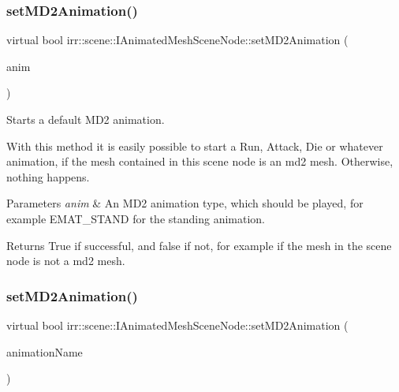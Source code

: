 \subsubsection{\texorpdfstring{set\+M\+D2\+Animation()}{setMD2Animation()}\hspace{0.1cm}{\footnotesize\ttfamily [2/4]}}
{\footnotesize\ttfamily virtual bool irr\+::scene\+::\+I\+Animated\+Mesh\+Scene\+Node\+::set\+M\+D2\+Animation (\begin{DoxyParamCaption}\item[{\hyperlink{namespaceirr_1_1scene_a08d4a84966e1d2886d0d57e4acbb4f19}{E\+M\+D2\+\_\+\+A\+N\+I\+M\+A\+T\+I\+O\+N\+\_\+\+T\+Y\+PE}}]{anim }\end{DoxyParamCaption})\hspace{0.3cm}{\ttfamily [pure virtual]}}



Starts a default M\+D2 animation. 

With this method it is easily possible to start a Run, Attack, Die or whatever animation, if the mesh contained in this scene node is an md2 mesh. Otherwise, nothing happens. 
\begin{DoxyParams}{Parameters}
{\em anim} & An M\+D2 animation type, which should be played, for example E\+M\+A\+T\+\_\+\+S\+T\+A\+ND for the standing animation. \\
\hline
\end{DoxyParams}
\begin{DoxyReturn}{Returns}
True if successful, and false if not, for example if the mesh in the scene node is not a md2 mesh. 
\end{DoxyReturn}
\mbox{\label{classirr_1_1scene_1_1IAnimatedMeshSceneNode_a8732866332327a7d43b91f41b5549fe3}} 
\subsubsection{\texorpdfstring{set\+M\+D2\+Animation()}{setMD2Animation()}\hspace{0.1cm}{\footnotesize\ttfamily [3/4]}}
{\footnotesize\ttfamily virtual bool irr\+::scene\+::\+I\+Animated\+Mesh\+Scene\+Node\+::set\+M\+D2\+Animation (\begin{DoxyParamCaption}\item[{const \hyperlink{namespaceirr_a9395eaea339bcb546b319e9c96bf7410}{c8} $\ast$}]{animation\+Name }\end{DoxyParamCaption})\hspace{0.3cm}{\ttfamily [pure virtual]}}



